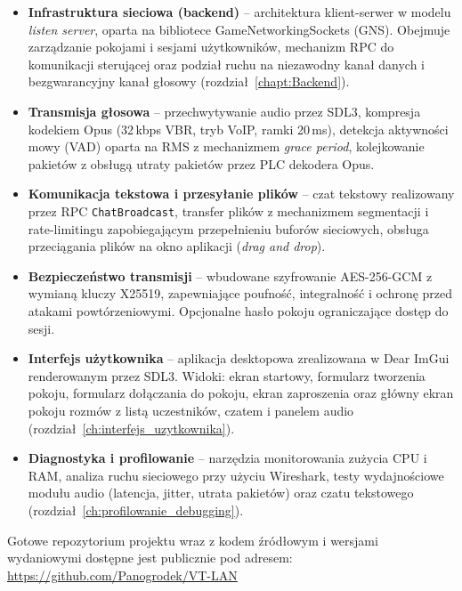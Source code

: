 \begin{itemize}
    \item \textbf{Infrastruktura sieciowa (backend)} -- architektura
    klient-serwer w modelu \textit{listen server}, oparta na bibliotece
    GameNetworkingSockets (GNS). Obejmuje zarządzanie pokojami i sesjami
    użytkowników, mechanizm RPC do komunikacji sterującej oraz podział ruchu
    na niezawodny kanał danych i bezgwarancyjny kanał głosowy
    (rozdział~\ref{chapt:Backend}).

    \item \textbf{Transmisja głosowa} -- przechwytywanie audio przez SDL3,
    kompresja kodekiem Opus (32\,kbps VBR, tryb VoIP, ramki 20\,ms),
    detekcja aktywności mowy (VAD) oparta na RMS z mechanizmem
    \textit{grace period}, kolejkowanie pakietów z obsługą utraty pakietów
    przez PLC dekodera Opus.

    \item \textbf{Komunikacja tekstowa i przesyłanie plików} -- czat
    tekstowy realizowany przez RPC \texttt{ChatBroadcast}, transfer plików
    z mechanizmem segmentacji i rate-limitingu zapobiegającym przepełnieniu
    buforów sieciowych, obsługa przeciągania plików na okno aplikacji
    (\textit{drag and drop}).

    \item \textbf{Bezpieczeństwo transmisji} -- wbudowane szyfrowanie
    AES-256-GCM z wymianą kluczy X25519, zapewniające poufność, integralność
    i ochronę przed atakami powtórzeniowymi. Opcjonalne hasło pokoju
    ograniczające dostęp do sesji.

    \item \textbf{Interfejs użytkownika} -- aplikacja desktopowa
    zrealizowana w Dear ImGui renderowanym przez SDL3. Widoki:
    ekran startowy, formularz tworzenia pokoju, formularz dołączania
    do pokoju, ekran zaproszenia oraz główny ekran pokoju rozmów
    z listą uczestników, czatem i panelem audio
    (rozdział~\ref{ch:interfejs_uzytkownika}).

    \item \textbf{Diagnostyka i profilowanie} -- narzędzia monitorowania
    zużycia CPU i RAM, analiza ruchu sieciowego przy użyciu Wireshark,
    testy wydajnościowe modułu audio (latencja, jitter, utrata pakietów)
    oraz czatu tekstowego (rozdział~\ref{ch:profilowanie_debugging}).
\end{itemize}

Gotowe repozytorium projektu wraz z kodem źródłowym i wersjami wydaniowymi
dostępne jest publicznie pod adresem:\\[6pt]
\url{https://github.com/Panogrodek/VT-LAN}

